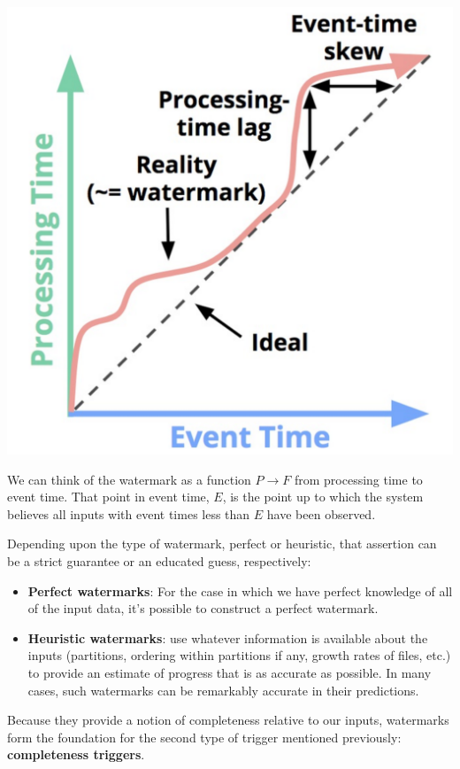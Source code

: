 \documentclass[11pt]{article}
\begin{document}
\begin{center}
\includegraphics[width=.8\textwidth]{../images/streamingsystems/3.png}
\end{center}

We can think of the watermark as a function \(P\to F\) from processing time to event time. That
point in event time, \(E\), is the point up to which the system believes all inputs with event
times less than \(E\) have been observed.

Depending upon the type of watermark, perfect or heuristic, that assertion can be a strict
guarantee or an educated guess, respectively:
\begin{itemize}
\item \textbf{Perfect watermarks}: For the case in which we have perfect knowledge of all of the input data,
it’s possible to construct a perfect watermark.
\item \textbf{Heuristic watermarks}: use whatever information is available about the inputs (partitions,
ordering within partitions if any, growth rates of files, etc.) to provide an estimate of
progress that is as accurate as possible. In many cases, such watermarks can be remarkably
accurate in their predictions.
\end{itemize}

Because they provide a notion of completeness relative to our inputs, watermarks form the
foundation for the second type of trigger mentioned previously: \textbf{completeness triggers}.
\end{document}
